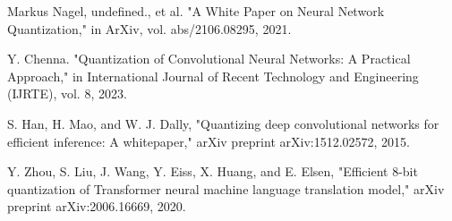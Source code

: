 \documentclass[lettersize,journal]{IEEEtran}
\begin{document}
\begin{thebibliography}{00}
	Markus Nagel, undefined., et al. "A White Paper on Neural Network Quantization," in ArXiv, vol. abs/2106.08295, 2021.
	
	Y. Chenna. "Quantization of Convolutional Neural Networks: A Practical Approach," in International Journal of Recent Technology and Engineering (ĲRTE), vol. 8, 2023.
	
	S. Han, H. Mao, and W. J. Dally, "Quantizing deep convolutional networks for efficient inference: A whitepaper," arXiv preprint arXiv:1512.02572, 2015.
	
	Y. Zhou, S. Liu, J. Wang, Y. Eiss, X. Huang, and E. Elsen, "Efficient 8-bit quantization of Transformer neural machine language translation model," arXiv preprint arXiv:2006.16669, 2020.


	
\end{thebibliography}
\end{document}
